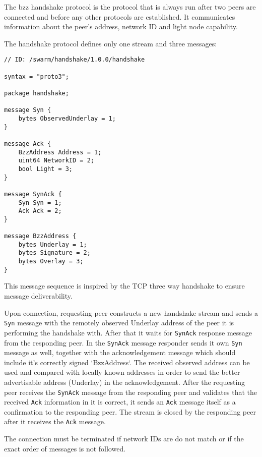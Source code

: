 

The bzz handshake protocol is the protocol that is always run after two peers are connected and before any other protocols are established. It communicates information about the  peer's address, network ID and light node capability.

The handshake protocol defines only one stream and three messages:

\begin{definition}\label{def:bzz-messages}

\begin{lstlisting}
// ID: /swarm/handshake/1.0.0/handshake

syntax = "proto3";

package handshake;

message Syn {
    bytes ObservedUnderlay = 1;
}

message Ack {
    BzzAddress Address = 1;
    uint64 NetworkID = 2;
    bool Light = 3;
}

message SynAck {
    Syn Syn = 1;
    Ack Ack = 2;
}

message BzzAddress {
    bytes Underlay = 1;
    bytes Signature = 2;
    bytes Overlay = 3;
}
\end{lstlisting}
\end{definition}

This message sequence is inspired by the TCP three way handshake to ensure message deliverability.

Upon connection, requesting peer constructs a new handshake stream and sends a \lstinline{Syn} message with the remotely observed Underlay address of the peer it is performing the handshake with. After that it waits for \lstinline{SynAck} response message from the responding peer. In  the  \lstinline{SynAck} message responder sends it own \lstinline{Syn} message as well, together with the acknowledgement message which should include it's correctly signed `BzzAddress`. The received observed address can be used and compared with locally known addresses in order to send the better advertisable address (Underlay) in the acknowledgement. After the requesting peer receives the \lstinline{SynAck} message from the responding peer and validates that the received \lstinline{Ack} information in it is correct, it sends an \lstinline{Ack} message itself as a confirmation to the responding peer. The stream is closed by the responding peer after it receives the \lstinline{Ack} message.

The connection must be terminated if network IDs are do not match or if the exact order of messages is not followed.

